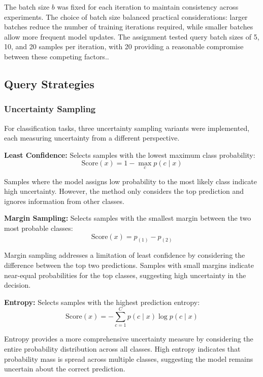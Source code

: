 \documentclass[conference]{IEEEtran}
\begin{document}
The batch size $b$ was fixed for each iteration to maintain consistency across experiments. The choice of batch size balanced practical considerations: larger batches reduce the number of training iterations required, while smaller batches allow more frequent model updates. The assignment tested query batch sizes of 5, 10, and 20 samples per iteration, with 20 providing a reasonable compromise between these competing factors..

\subsection{Query Strategies}

\subsubsection{Uncertainty Sampling}

For classification tasks, three uncertainty sampling variants were implemented, each measuring uncertainty from a different perspective.

\textbf{Least Confidence:} Selects samples with the lowest maximum class probability:
\begin{equation}
\text{Score}(x) = 1 - \max_c p(c \mid x)
\end{equation}

Samples where the model assigns low probability to the most likely class indicate high uncertainty. However, the method only considers the top prediction and ignores information from other classes.

\textbf{Margin Sampling:} Selects samples with the smallest margin between the two most probable classes:
\begin{equation}
\text{Score}(x) = p_{(1)} - p_{(2)}
\end{equation}

Margin sampling addresses a limitation of least confidence by considering the difference between the top two predictions. Samples with small margins indicate near-equal probabilities for the top classes, suggesting high uncertainty in the decision.

\textbf{Entropy:} Selects samples with the highest prediction entropy:
\begin{equation}
\text{Score}(x) = -\sum_{c=1}^C p(c \mid x) \log p(c \mid x)
\end{equation}

Entropy provides a more comprehensive uncertainty measure by considering the entire probability distribution across all classes. High entropy indicates that probability mass is spread across multiple classes, suggesting the model remains uncertain about the correct prediction.
\end{document}
